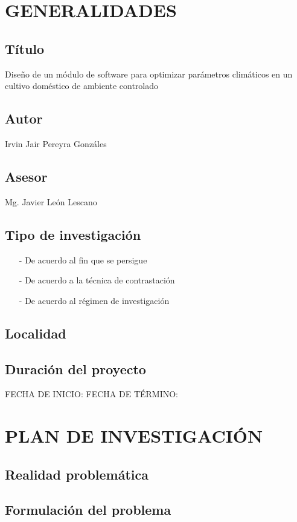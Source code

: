 \documentclass{report}
\date{\today}
\begin{document}
\tableofcontents
{}

\section{GENERALIDADES}
\subsection{Título}
Diseño de un módulo de software para optimizar parámetros climáticos en un
cultivo doméstico de ambiente controlado
\subsection{Autor}
Irvin Jair Pereyra Gonzáles
\subsection{Asesor}
Mg. Javier León Lescano
\subsection{Tipo de investigación}
\begin{enumerate}
\item[-] De acuerdo al fin que se persigue
\item[-] De acuerdo a la técnica de contrastación
\item[-] De acuerdo al régimen de investigación
\end{enumerate}
\subsection{Localidad}
\subsection{Duración del proyecto}
FECHA DE INICIO:
FECHA DE TÉRMINO:

\section{PLAN DE INVESTIGACIÓN}
\subsection{Realidad problemática}
\subsection{Formulación del problema}
\end{document}
